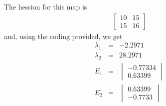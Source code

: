 \documentclass[11pt]{SelfArxOneColBMN}
\begin{document}
\begin{solution}
  The hession for this map is
  \begin{eqnarray*}
    \begin{bmatrix}
      10 & 15\\
      15 & 16
    \end{bmatrix}
  \end{eqnarray*}
  and, using the coding provided, we get
  \begin{eqnarray*}
    \lambda_1 &=& -2.2971\\
    \lambda_2 &=& 28.2971\\
    E_1 &=&
    \begin{vmatrix}
      -0.77334\\
      0.63399
    \end{vmatrix}
    \\
    E_2 &=&
    \begin{vmatrix}
      0.63399\\
      -0.7733
    \end{vmatrix} 
  \end{eqnarray*}
\end{solution}
\end{document}
